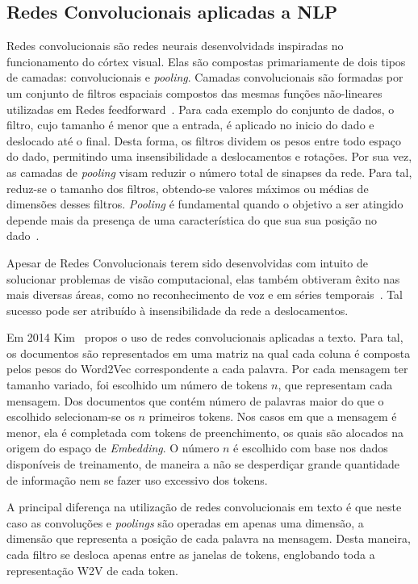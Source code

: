 \subsection{Redes Convolucionais aplicadas a NLP}

Redes convolucionais são redes neurais desenvolvidads inspiradas no funcionamento do córtex visual.
Elas são compostas primariamente de dois tipos de camadas: convolucionais e \textit{pooling}.
Camadas convolucionais são formadas por um conjunto de filtros espaciais compostos das mesmas funções não-lineares
utilizadas em Redes feedforward~\cite{goodfellow16}.
Para cada exemplo do conjunto de dados, o filtro, cujo tamanho é menor que a entrada, é aplicado no inicio do dado e
deslocado até o final.
Desta forma, os filtros dividem os pesos entre todo espaço do dado, permitindo uma insensibilidade a deslocamentos e
rotações.
Por sua vez, as camadas de \textit{pooling} visam reduzir o número total de sinapses da rede.
Para tal, reduz-se o tamanho dos filtros, obtendo-se valores máximos ou médias de dimensões desses filtros.
\textit{Pooling} é fundamental quando o objetivo a ser atingido depende mais da presença de uma característica do que
sua sua posição no dado~\cite{goodfellow16}.

Apesar de Redes Convolucionais terem sido desenvolvidas com intuito de solucionar problemas de visão computacional,
elas também obtiveram êxito nas mais diversas áreas, como no reconhecimento de voz e em séries temporais~\cite{lecun95}.
Tal sucesso pode ser atribuído à insensibilidade da rede a deslocamentos.

Em 2014 Kim~\cite{kim14} propos o uso de redes convolucionais aplicadas a texto.
Para tal, os documentos são representados em uma matriz na qual cada coluna é composta pelos pesos do Word2Vec
correspondente a cada palavra.
Por cada mensagem ter tamanho variado, foi escolhido um número de tokens $n$, que representam cada mensagem.
Dos documentos que contém número de palavras maior do que o escolhido selecionam-se os $n$ primeiros tokens.
Nos casos em que a mensagem é menor, ela é completada com tokens de preenchimento, os quais são alocados na origem do
espaço de \textit{Embedding}.
O número $n$ é escolhido com base nos dados disponíveis de treinamento, de maneira a não se desperdiçar grande
quantidade de informação nem se fazer uso excessivo dos tokens.

A principal diferença na utilização de redes convolucionais em texto é que neste caso as convoluções e \textit{poolings}
são operadas em apenas uma dimensão, a dimensão que representa a posição de cada palavra na mensagem.
Desta maneira, cada filtro se desloca apenas entre as janelas de tokens, englobando toda a representação W2V de cada
token.

